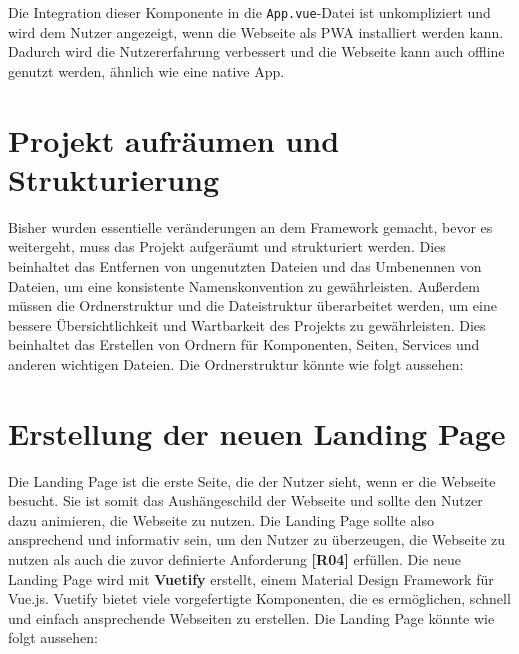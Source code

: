 Die Integration dieser Komponente in die \texttt{App.vue}-Datei ist unkompliziert und wird dem Nutzer angezeigt, wenn die Webseite als \acs{PWA} installiert werden kann. Dadurch wird die Nutzererfahrung verbessert und die Webseite kann auch offline genutzt werden, ähnlich wie eine native App. \cite{vite-plugin-pwa}

\section{Projekt aufräumen und Strukturierung}

Bisher wurden essentielle veränderungen an dem Framework gemacht, bevor es weitergeht, muss das Projekt aufgeräumt und strukturiert werden. Dies beinhaltet das Entfernen von ungenutzten Dateien und das Umbenennen von Dateien, um eine konsistente Namenskonvention zu gewährleisten. Außerdem müssen die Ordnerstruktur und die Dateistruktur überarbeitet werden, um eine bessere Übersichtlichkeit und Wartbarkeit des Projekts zu gewährleisten. Dies beinhaltet das Erstellen von Ordnern für Komponenten, Seiten, Services und anderen wichtigen Dateien. Die Ordnerstruktur könnte wie folgt aussehen:

\section{Erstellung der neuen Landing Page}

Die Landing Page ist die erste Seite, die der Nutzer sieht, wenn er die Webseite besucht. Sie ist somit das Aushängeschild der Webseite und sollte den Nutzer dazu animieren, die Webseite zu nutzen. Die Landing Page sollte also ansprechend und informativ sein, um den Nutzer zu überzeugen, die Webseite zu nutzen als auch die zuvor definierte Anforderung \textbf{[R04]} erfüllen. Die neue Landing Page wird mit \textbf{Vuetify} erstellt, einem Material Design Framework für Vue.js. Vuetify bietet viele vorgefertigte Komponenten, die es ermöglichen, schnell und einfach ansprechende Webseiten zu erstellen. Die Landing Page könnte wie folgt aussehen:

